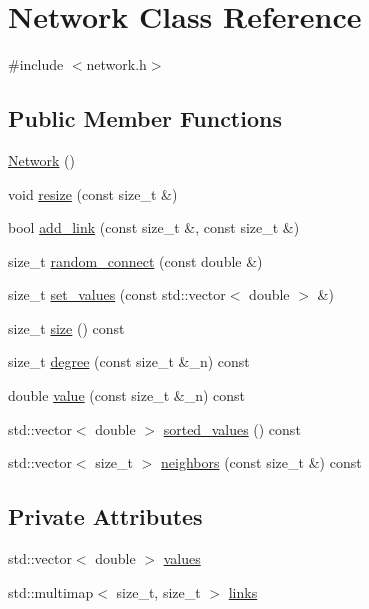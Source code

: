 \hypertarget{classNetwork}{}\section{Network Class Reference}
\label{classNetwork}


{\ttfamily \#include $<$network.\+h$>$}

\subsection*{Public Member Functions}
\begin{DoxyCompactItemize}
\item 
\mbox{\hyperlink{classNetwork_a3cc2fb4f8fa4d507077e8da85ce5a1c8}{Network}} ()
\item 
void \mbox{\hyperlink{classNetwork_a8f0092f24eaab8c8ab07745743b4ce8b}{resize}} (const size\+\_\+t \&)
\item 
bool \mbox{\hyperlink{classNetwork_a2bc02af56e866adf0c55a2c49885551a}{add\+\_\+link}} (const size\+\_\+t \&, const size\+\_\+t \&)
\item 
size\+\_\+t \mbox{\hyperlink{classNetwork_aab69fcd3971532b165c4a4ff7df4b81c}{random\+\_\+connect}} (const double \&)
\item 
size\+\_\+t \mbox{\hyperlink{classNetwork_aee0b1927ab5693cf90a00fe4d505c427}{set\+\_\+values}} (const std\+::vector$<$ double $>$ \&)
\item 
size\+\_\+t \mbox{\hyperlink{classNetwork_a41c54d12d861883170b5c5abca3a7bc8}{size}} () const
\item 
size\+\_\+t \mbox{\hyperlink{classNetwork_a7bd299baab15f2652fa697b1afde3977}{degree}} (const size\+\_\+t \&\+\_\+n) const
\item 
double \mbox{\hyperlink{classNetwork_a9b9cb94c0af24ce5417d840727fb5ad3}{value}} (const size\+\_\+t \&\+\_\+n) const
\item 
std\+::vector$<$ double $>$ \mbox{\hyperlink{classNetwork_a07ae19f51e2440a711ced30b1f371197}{sorted\+\_\+values}} () const
\item 
std\+::vector$<$ size\+\_\+t $>$ \mbox{\hyperlink{classNetwork_af57d8903e88666b66fd3cc3b8de143da}{neighbors}} (const size\+\_\+t \&) const
\end{DoxyCompactItemize}
\subsection*{Private Attributes}
\begin{DoxyCompactItemize}
\item 
std\+::vector$<$ double $>$ \mbox{\hyperlink{classNetwork_ab4062dd3b2fc7825f21a686d76e3c696}{values}}
\item 
std\+::multimap$<$ size\+\_\+t, size\+\_\+t $>$ \mbox{\hyperlink{classNetwork_a1b5fbd7815319e330841dbd961d9f8cc}{links}}
\end{DoxyCompactItemize}


